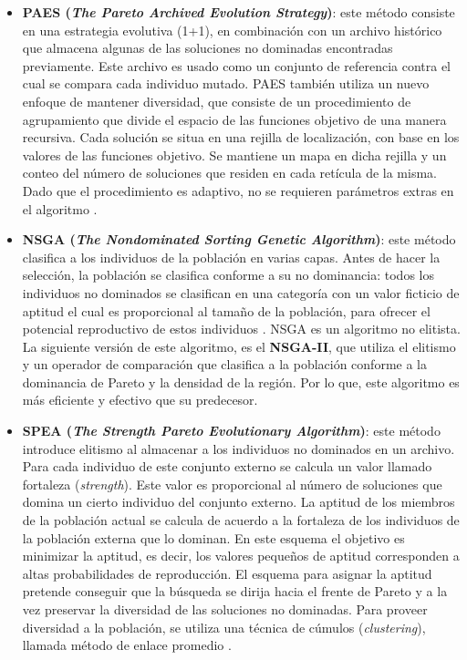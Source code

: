 \begin{itemize}
   \begin{itemize}
    \item \textbf{PAES (\textit{The Pareto Archived Evolution Strategy})}: este m\'etodo consiste en una estrategia evolutiva (1+1),
    en combinaci\'on con un archivo hist\'orico que almacena algunas de las soluciones no dominadas encontradas previamente. Este
    archivo es usado como un conjunto de referencia contra el cual se compara cada individuo mutado. PAES tambi\'en utiliza un nuevo 
    enfoque de mantener diversidad, que consiste de un procedimiento de agrupamiento que divide el espacio de las funciones objetivo 
    de una manera recursiva. Cada soluci\'on se situa en una rejilla de localizaci\'on, con base en los valores de las funciones
    objetivo. Se mantiene un mapa en dicha rejilla y un conteo del n\'umero de soluciones que residen en cada ret\'icula de la misma.
    Dado que el procedimiento es adaptivo, no se requieren par\'ametros extras en el algoritmo \cite{paes99}.
    
    \item \textbf{NSGA (\textit{The Nondominated Sorting Genetic Algorithm})}: este m\'etodo clasifica a los 
    individuos de la poblaci\'on en varias capas. Antes de hacer la selecci\'on, la poblaci\'on se clasifica conforme a 
    su no dominancia: todos los individuos no dominados se clasifican en una categor\'ia con un valor ficticio de 
    aptitud el cual es proporcional al tama\~no de la poblaci\'on, para ofrecer el potencial reproductivo de estos 
    individuos \cite{Srinivas94}. NSGA es un algoritmo no elitista. La siguiente versi\'on de este algoritmo, es el \textbf{NSGA-II}, 
    que utiliza el elitismo y un operador de comparaci\'on que clasifica a la poblaci\'on conforme a la dominancia de Pareto y 
    la densidad de la regi\'on. Por lo que, este algoritmo es m\'as eficiente y efectivo que su predecesor.
    
    \item \textbf{SPEA (\textit{The Strength Pareto Evolutionary Algorithm})}: este m\'etodo introduce elitismo al almacenar a los
    individuos no dominados en un archivo. Para cada individuo de este conjunto externo se calcula un valor llamado fortaleza 
    (\textit{strength}). Este valor es proporcional al n\'umero de soluciones que domina un cierto individuo del conjunto externo.
    La aptitud de los miembros de la poblaci\'on actual se calcula de acuerdo a la fortaleza de los individuos de la poblaci\'on
    externa que lo dominan. En este esquema el objetivo es minimizar la aptitud, es decir, los valores peque\~nos de aptitud corresponden 
    a altas probabilidades 	de reproducci\'on. El esquema para asignar la aptitud pretende conseguir que la b\'usqueda 
    se dirija hacia el frente de Pareto y a la vez preservar la diversidad de las soluciones no dominadas. Para proveer 
    diversidad a la poblaci\'on, se utiliza una t\'ecnica de c\'umulos (\textit{clustering}), llamada m\'etodo de enlace 
    promedio \cite{Zitzler99}. 
    

\end{itemize}
\end{itemize}
